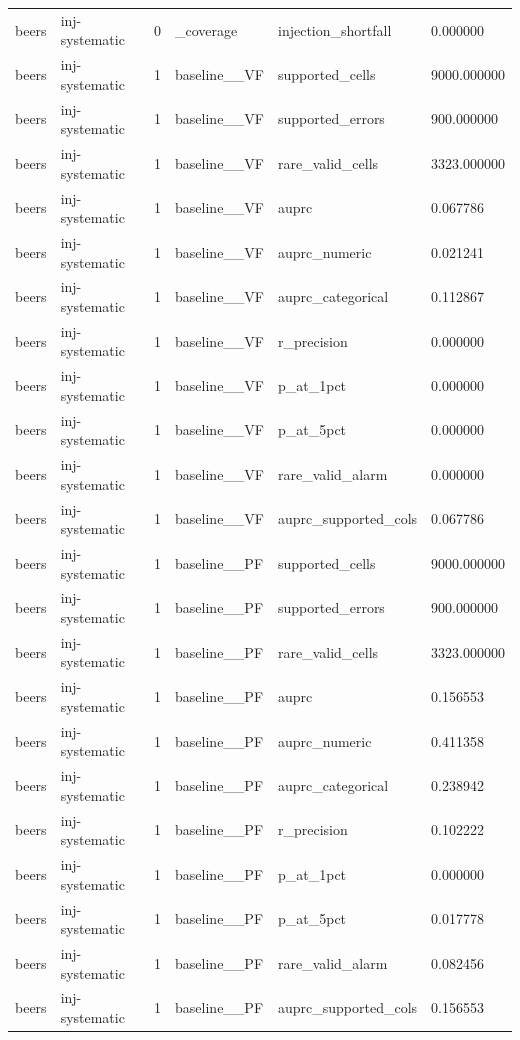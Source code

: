 \begin{tabular}{llllll}
beers & inj-systematic & 0 & \_coverage & injection\_shortfall & 0.000000 \\
beers & inj-systematic & 1 & baseline\_\_VF & supported\_cells & 9000.000000 \\
beers & inj-systematic & 1 & baseline\_\_VF & supported\_errors & 900.000000 \\
beers & inj-systematic & 1 & baseline\_\_VF & rare\_valid\_cells & 3323.000000 \\
beers & inj-systematic & 1 & baseline\_\_VF & auprc & 0.067786 \\
beers & inj-systematic & 1 & baseline\_\_VF & auprc\_numeric & 0.021241 \\
beers & inj-systematic & 1 & baseline\_\_VF & auprc\_categorical & 0.112867 \\
beers & inj-systematic & 1 & baseline\_\_VF & r\_precision & 0.000000 \\
beers & inj-systematic & 1 & baseline\_\_VF & p\_at\_1pct & 0.000000 \\
beers & inj-systematic & 1 & baseline\_\_VF & p\_at\_5pct & 0.000000 \\
beers & inj-systematic & 1 & baseline\_\_VF & rare\_valid\_alarm & 0.000000 \\
beers & inj-systematic & 1 & baseline\_\_VF & auprc\_supported\_cols & 0.067786 \\
beers & inj-systematic & 1 & baseline\_\_PF & supported\_cells & 9000.000000 \\
beers & inj-systematic & 1 & baseline\_\_PF & supported\_errors & 900.000000 \\
beers & inj-systematic & 1 & baseline\_\_PF & rare\_valid\_cells & 3323.000000 \\
beers & inj-systematic & 1 & baseline\_\_PF & auprc & 0.156553 \\
beers & inj-systematic & 1 & baseline\_\_PF & auprc\_numeric & 0.411358 \\
beers & inj-systematic & 1 & baseline\_\_PF & auprc\_categorical & 0.238942 \\
beers & inj-systematic & 1 & baseline\_\_PF & r\_precision & 0.102222 \\
beers & inj-systematic & 1 & baseline\_\_PF & p\_at\_1pct & 0.000000 \\
beers & inj-systematic & 1 & baseline\_\_PF & p\_at\_5pct & 0.017778 \\
beers & inj-systematic & 1 & baseline\_\_PF & rare\_valid\_alarm & 0.082456 \\
beers & inj-systematic & 1 & baseline\_\_PF & auprc\_supported\_cols & 0.156553 \\

\end{tabular}
